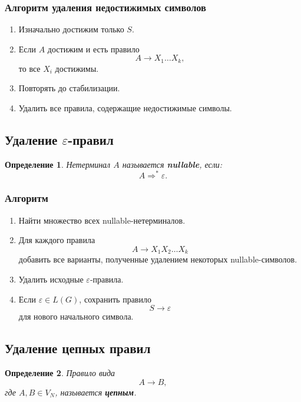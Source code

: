 \documentclass[12pt,a4paper]{article}
\newtheorem{definition}{Определение}
\newcommand{\eps}{\varepsilon}
\newcommand{\derivesstar}{\Rightarrow^{*}}
\begin{document}
\subsubsection*{Алгоритм удаления недостижимых символов}

\begin{enumerate}
    \item Изначально достижим только $S$.
    \item Если $A$ достижим и есть правило
    \[
    A\to X_1\ldots X_k,
    \]
    то все $X_i$ достижимы.
    \item Повторять до стабилизации.
    \item Удалить все правила, содержащие недостижимые символы.
\end{enumerate}

\subsection{Удаление $\eps$-правил}

\begin{definition}
Нетерминал $A$ называется \textbf{nullable}, если:
\[
A\derivesstar \eps.
\]
\end{definition}

\subsubsection*{Алгоритм}

\begin{enumerate}
    \item Найти множество всех nullable-нетерминалов.
    \item Для каждого правила
    \[
    A\to X_1X_2\ldots X_k
    \]
    добавить все варианты, полученные удалением некоторых nullable-символов.
    \item Удалить исходные $\eps$-правила.
    \item Если $\eps\in L(G)$, сохранить правило
    \[
    S\to\eps
    \]
    для нового начального символа.
\end{enumerate}

\subsection{Удаление цепных правил}

\begin{definition}
Правило вида
\[
A\to B,
\]
где $A,B\in V_N$, называется \textbf{цепным}.
\end{definition}
\end{document}

